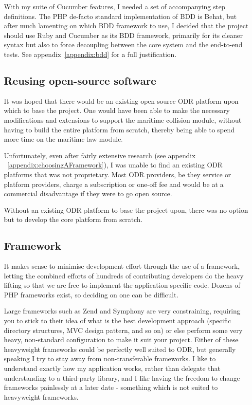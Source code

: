 With my suite of Cucumber features, I needed a set of accompanying step definitions. The PHP de-facto standard implementation of BDD is Behat,  but after much lamenting on which BDD framework to use, I decided that the project should use Ruby and Cucumber as its BDD framework, primarily for its cleaner syntax but also to force decoupling between the core system and the end-to-end tests. See appendix~\ref{appendix:bdd} for a full justification.

\subsection{Reusing open-source software}

It was hoped that there would be an existing open-source ODR platform upon which to base the project. One would have been able to make the necessary modifications and extensions to support the maritime collision module, without having to build the entire platform from scratch, thereby being able to spend more time on the maritime law module.

Unfortunately, even after fairly extensive research (see appendix ~\ref{appendix:choosingAFramework}), I was unable to find an existing ODR platforms that was not proprietary. Most ODR providers, be they service or platform providers, charge a subscription or one-off fee and would be at a commercial disadvantage if they were to go open source.

Without an existing ODR platform to base the project upon, there was no option but to develop the core platform from scratch.

\subsection{Framework}

It makes sense to minimise development effort through the use of a framework, letting the combined efforts of hundreds of contributing developers do the heavy lifting so that we are free to implement the application-specific code. Dozens of PHP frameworks exist, so deciding on one can be difficult.

Large frameworks such as Zend and Symphony are very constraining, requiring you to stick to their idea of what is the best development approach (specific directory structures, MVC design pattern, and so on) or else perform some very heavy, non-standard configuration to make it suit your project. Either of these heavyweight frameworks could be perfectly well suited to ODR, but generally speaking I try to stay away from non-transferable frameworks. I like to understand exactly how my application works, rather than delegate that understanding to a third-party library, and I like having the freedom to change frameworks painlessly at a later date - something which is not suited to heavyweight frameworks.

